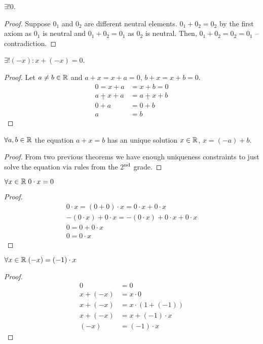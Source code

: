 \begin{theorem}
    $\exists!0$.
\end{theorem}
\begin{proof}
    Suppose $0_1$ and $0_2$ are different neutral elements. $0_1 + 0_2 = 0_2$ by the first axiom as $0_1$ is neutral and $0_1 + 0_2 = 0_1$ as $0_2$ is neutral. Then, $0_1 + 0_2 = 0_2 = 0_1$ -- contradiction.
\end{proof}

\begin{theorem}
    $\exists! (-x): x + (-x) = 0$.
\end{theorem}
\begin{proof}
    Let $a \ne b \in \mathbb{R}$ and $a + x = x + a = 0$, $b + x = x + b = 0$.
    \begin{align*}
        0 = x + a &= x + b = 0 \\
        \underline{a + x} + a &= \underline{a + x} + b \\
        0 + a &= 0 + b \\
        a &= b
    \end{align*}
\end{proof}

\begin{theorem}
    $\forall a, b \in \mathbb{R}$ the equation $a + x = b$ has an unique solution $x \in \mathbb{R}$, $x = (-a) + b$.
\end{theorem}
\begin{proof}
    From two previous theorems we have enough uniqueness constraints to just solve the equation via rules from the 2$^{\rm nd}$ grade.
\end{proof}

\begin{theorem} $ \forall x \in \mathbb{R} \; 0 \cdot x = 0 $ \end{theorem}
\begin{proof}
    \begin{gather*}
        0 \cdot x = (0 + 0) \cdot x = 0 \cdot x + 0 \cdot x \\
        -(0 \cdot x) + 0 \cdot x = -(0 \cdot x) + 0 \cdot x + 0 \cdot x \\
        0 = 0 + 0 \cdot x \\
        0 = 0 \cdot x
    \end{gather*}
\end{proof}

\begin{theorem} $\forall x \in \mathbb{R} \; (-x) = (-1) \cdot x$ \end{theorem}
\begin{proof}
    \begin{align*}
        0 &= 0 \\
        x + (-x) &= x \cdot 0 \\
        x + (-x) &= x \cdot (1 + (-1)) \\
        x + (-x) &= x + (-1) \cdot x \\
        (-x) &= (-1) \cdot x
    \end{align*}
\end{proof}

